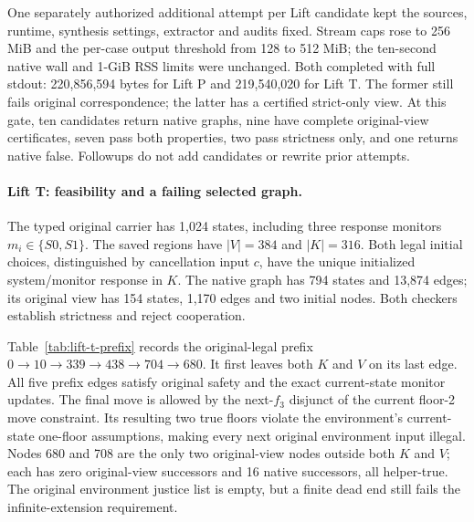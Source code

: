 One separately authorized additional attempt per Lift candidate kept the
sources, runtime, synthesis settings, extractor and audits fixed. Stream
caps rose to 256 MiB and the per-case output threshold from 128 to
512 MiB; the ten-second native wall and 1-GiB RSS limits were unchanged.
Both completed with full stdout: 220,856,594 bytes for Lift P and
219,540,020 for Lift T. The former still fails original correspondence;
the latter has a certified strict-only view. At this gate, ten candidates return
native graphs, nine have complete original-view certificates, seven pass
both properties, two pass strictness only, and one returns native false.
Followups do not add candidates or rewrite prior attempts.





\paragraph{Lift T: feasibility and a failing selected graph.}
The typed original carrier has 1,024 states, including three response
monitors $m_i\in\{S0,S1\}$. The saved regions have $|V|=384$ and
\mbox{$|K|=316$}. Both legal initial choices, distinguished by cancellation
input $c$, have the unique initialized system/monitor response in $K$.
The native graph has 794 states and 13,874 edges; its original view has
154 states, 1,170 edges and two initial nodes. Both checkers establish
strictness and reject cooperation.

Table~\ref{tab:lift-t-prefix} records the original-legal prefix
$0\to10\to339\to438\to704\to680$.
It first leaves both $K$ and $V$ on its last edge.
All five prefix edges satisfy original safety and the exact current-state
monitor updates. The final move is allowed by the next-$f_3$ disjunct
of the current floor-2 move constraint. Its resulting two true floors
violate the environment's current-state one-floor assumptions, making
every next original environment input illegal. Nodes 680 and 708 are
the only two original-view nodes outside both $K$ and $V$; each has
zero original-view successors and 16 native successors, all helper-true.
The original environment justice list is empty, but a finite dead end
still fails the infinite-extension requirement.

